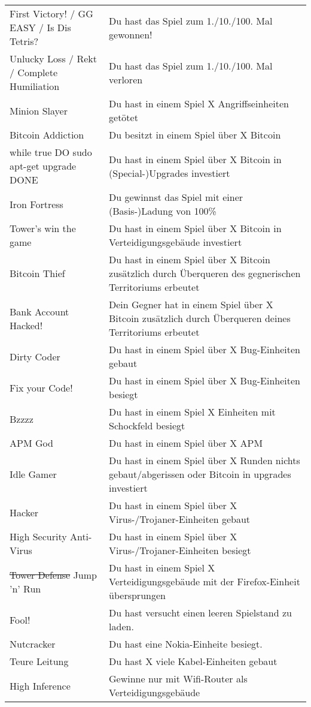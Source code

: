\begin{table}[ht]
\begin{longtabu}{X[-1]X}
    First Victory! / GG EASY / Is Dis Tetris?
      & Du hast das Spiel zum 1./10./100. Mal gewonnen!
      	\\
    Unlucky Loss / Rekt / Complete Humiliation
    	& Du hast das Spiel zum 1./10./100. Mal verloren
    	\\
	Minion Slayer
		& Du hast in einem Spiel X Angriffseinheiten getötet
		\\
	Bitcoin Addiction
		& Du besitzt in einem Spiel über X Bitcoin
		\\
	while true DO sudo apt-get upgrade DONE
		& Du hast in einem Spiel über X Bitcoin in (Special-)Upgrades investiert
		\\
	Iron Fortress
		& Du gewinnst das Spiel mit einer (Basis-)Ladung von 100\%
		\\
	Tower's win the game
		& Du hast in einem Spiel über X Bitcoin in Verteidigungsgebäude investiert
		\\
	Bitcoin Thief
		& Du hast in einem Spiel über X Bitcoin zusätzlich durch Überqueren des gegnerischen
		Territoriums erbeutet
		\\
	Bank Account Hacked!
		& Dein Gegner hat in einem Spiel über X Bitcoin zusätzlich durch Überqueren deines
		Territoriums erbeutet
		\\
	Dirty Coder
		& Du hast in einem Spiel über X Bug-Einheiten gebaut
		\\
	Fix your Code!
		& Du hast in einem Spiel über X Bug-Einheiten besiegt
		\\
	Bzzzz
		& Du hast in einem Spiel X Einheiten mit Schockfeld besiegt
		\\
	APM God
		& Du hast in einem Spiel über X APM
		\\
	Idle Gamer
		& Du hast in einem Spiel über X Runden nichts gebaut/abgerissen oder Bitcoin in upgrades investiert
		\\
	Hacker
		& Du hast in einem Spiel über X Virus-/Trojaner-Einheiten gebaut
		\\
	High Security Anti-Virus
		& Du hast in einem Spiel über X Virus-/Trojaner-Einheiten besiegt
		\\
	\st{Tower Defense} Jump 'n' Run
		& Du hast in einem Spiel X Verteidigungsgebäude mit der Firefox-Einheit übersprungen
		\\
	Fool!
		& Du hast versucht einen leeren Spielstand zu laden.
		\\
	Nutcracker
		& Du hast eine Nokia-Einheite besiegt.
		\\
	Teure Leitung
		& Du hast X viele Kabel-Einheiten gebaut
		\\
	High Inference
		& Gewinne nur mit Wifi-Router als Verteidigungsgebäude
		\\
    \bottomrule
  \end{longtabu}
\end{table}

